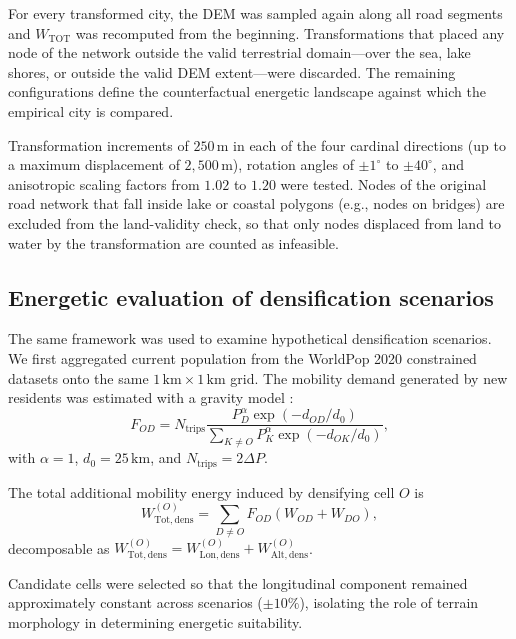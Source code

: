 \documentclass[twocolumn,amsmath,amssymb,floatfix,nature,shownopacs,footinbib,superscriptaddress]{revtex4-2}
\begin{document}
For every transformed city, the DEM was sampled again along all road segments and $W_{\mathrm{TOT}}$ was recomputed from the beginning. Transformations that placed any node of the network outside the valid terrestrial domain---over the sea, lake shores, or outside the valid DEM extent---were discarded. The remaining configurations define the counterfactual energetic landscape against which the empirical city is compared.

Transformation increments of $250\,\mathrm{m}$ in each of the four cardinal directions (up to a maximum displacement of $2{,}500\,\mathrm{m}$), rotation angles of $\pm 1^\circ$ to $\pm 40^\circ$, and anisotropic scaling factors from $1.02$ to $1.20$ were tested. Nodes of the original road network that fall inside lake or coastal polygons (e.g., nodes on bridges) are excluded from the land-validity check, so that only nodes displaced from land to water by the transformation are counted as infeasible.

\subsection*{Energetic evaluation of densification scenarios}

The same framework was used to examine hypothetical densification scenarios. We first aggregated current population from the WorldPop 2020 constrained datasets \cite{worldpop} onto the same $1\,\mathrm{km}\times1\,\mathrm{km}$ grid. The mobility demand generated by new residents was estimated with a gravity model \cite{wilson1971}:
\begin{equation}
    F_{OD} = N_{\mathrm{trips}}\frac{P_D^{\alpha}\exp(-d_{OD}/d_0)}{\sum_{K\neq O}P_K^{\alpha}\exp(-d_{OK}/d_0)},
\end{equation}
with $\alpha=1$, $d_0=25\,\mathrm{km}$, and $N_{\mathrm{trips}}=2\Delta P$.

The total additional mobility energy induced by densifying cell $O$ is
\begin{equation}
    W_{\mathrm{Tot,dens}}^{(O)} = \sum_{D\neq O} F_{OD} \left(W_{OD}+W_{DO}\right),
\end{equation}
decomposable as $W_{\mathrm{Tot,dens}}^{(O)} = W_{\mathrm{Lon,dens}}^{(O)} + W_{\mathrm{Alt,dens}}^{(O)}$.

Candidate cells were selected so that the longitudinal component remained approximately constant across scenarios ($\pm10\%$), isolating the role of terrain morphology in determining energetic suitability.
\end{document}
